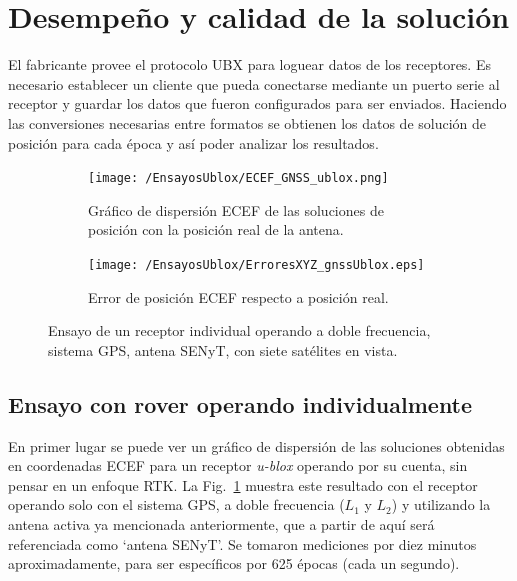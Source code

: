 \documentclass[a4paper,12pt,oneside,onecolumn,final,openright]{book}%
\begin{document}
\section{Desempeño y calidad de la solución}
	El fabricante provee el protocolo UBX para loguear datos de los receptores. Es necesario establecer un cliente que pueda conectarse mediante un puerto serie al receptor y guardar los datos que fueron configurados para ser enviados. Haciendo las conversiones necesarias entre formatos se obtienen los datos de solución de posición para cada época y así poder analizar los resultados.
\begin{figure}
\begin{subfigure}{1\linewidth}
\centering
  	\texttt{[image: /EnsayosUblox/ECEF\_GNSS\_ublox.png]}
  	\caption{Gráfico de dispersión ECEF de las soluciones de posición con la posición real de la antena.}
    \label{fig:scatter_ublox_GNSS}
\end{subfigure}

\begin{subfigure}{1\linewidth}
\centering
 	\texttt{[image: /EnsayosUblox/ErroresXYZ\_gnssUblox.eps]}
 	\caption{Error de posición ECEF respecto a posición real.}
  	\label{fig:error_ublox_GNSS}
\end{subfigure}
\caption{Ensayo de un receptor individual operando a doble frecuencia, sistema GPS, antena SENyT, con siete satélites en vista.}
\label{fig:ensayoGNSS_ublox}
\end{figure}
\subsection{Ensayo con rover operando individualmente}\label{sec:rover_alone}
	En primer lugar se puede ver un gráfico de dispersión de las soluciones obtenidas en coordenadas ECEF para un receptor \textit{u-blox} operando por su cuenta, sin pensar en un enfoque RTK. La Fig.~\ref{fig:scatter_ublox_GNSS} muestra este resultado con el receptor operando solo con el sistema GPS, a doble frecuencia ($L_1$ y $L_2$) y utilizando la antena activa ya mencionada anteriormente, que a partir de aquí será referenciada como `antena SENyT'. Se tomaron mediciones por diez minutos aproximadamente, para ser específicos por 625 épocas (cada un segundo).
\end{document}

